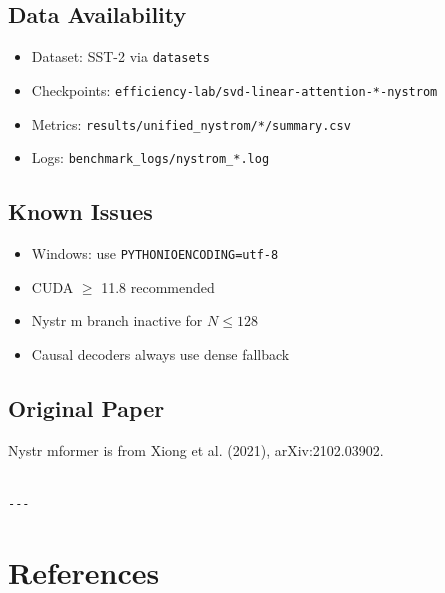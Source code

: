 \subsection{Data Availability}

\begin{itemize}
\item Dataset: SST-2 via \texttt{datasets}
\item Checkpoints: \texttt{efficiency-lab/svd-linear-attention-*-nystrom}
\item Metrics: \texttt{results/unified\_nystrom/*/summary.csv}
\item Logs: \texttt{benchmark\_logs/nystrom\_*.log}

\end{itemize}
\subsection{Known Issues}

\begin{itemize}
\item Windows: use \texttt{PYTHONIOENCODING=utf-8}
\item CUDA $\ge$ 11.8 recommended
\item Nystr m branch inactive for $N \leq 128$
\item Causal decoders always use dense fallback

\end{itemize}
\subsection{Original Paper}

Nystr mformer is from Xiong et al. (2021), arXiv:2102.03902.
\begin{lstlisting}

---
\end{lstlisting}


\section{References}

